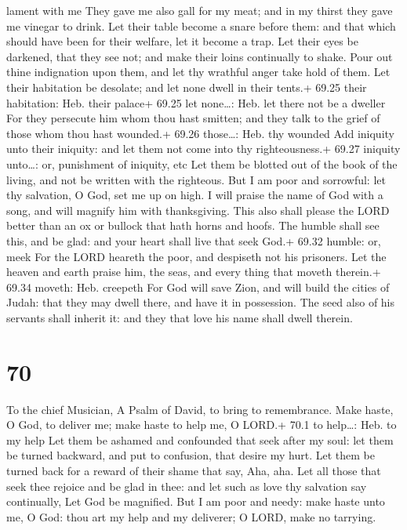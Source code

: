 lament with me  They gave me also gall for my meat; and in
my thirst they gave me vinegar to drink.  Let their table
become a snare before them: and that which should have been for their
welfare, let it become a trap.  Let their eyes be darkened,
that they see not; and make their loins continually to shake.
 Pour out thine indignation upon them, and let thy wrathful
anger take hold of them.  Let their habitation be desolate;
and let none dwell in their tents.+ 69.25 their habitation: Heb. their
palace+ 69.25 let none\ldots: Heb. let there not be a dweller
 For they persecute him whom thou hast smitten; and they
talk to the grief of those whom thou hast wounded.+ 69.26 those\ldots:
Heb. thy wounded  Add iniquity unto their iniquity: and let
them not come into thy righteousness.+ 69.27 iniquity unto\ldots: or,
punishment of iniquity, etc  Let them be blotted out of the
book of the living, and not be written with the righteous. 
But I am poor and sorrowful: let thy salvation, O God, set me up on
high.  I will praise the name of God with a song, and will
magnify him with thanksgiving.  This also shall please the
LORD better than an ox or bullock that hath horns and hoofs.
 The humble shall see this, and be glad: and your heart
shall live that seek God.+ 69.32 humble: or, meek  For the
LORD heareth the poor, and despiseth not his prisoners. 
Let the heaven and earth praise him, the seas, and every thing that
moveth therein.+ 69.34 moveth: Heb. creepeth  For God will
save Zion, and will build the cities of Judah: that they may dwell
there, and have it in possession.  The seed also of his
servants shall inherit it: and they that love his name shall dwell
therein.

\hypertarget{section-69}{%
\section{70}\label{section-69}}

To the chief Musician, A Psalm of David, to bring to remembrance.
 Make haste, O God, to deliver me; make haste to help me, O
LORD.+ 70.1 to help\ldots: Heb. to my help  Let them be
ashamed and confounded that seek after my soul: let them be turned
backward, and put to confusion, that desire my hurt.  Let
them be turned back for a reward of their shame that say, Aha, aha.
 Let all those that seek thee rejoice and be glad in thee:
and let such as love thy salvation say continually, Let God be
magnified.  But I am poor and needy: make haste unto me, O
God: thou art my help and my deliverer; O LORD, make no tarrying.

